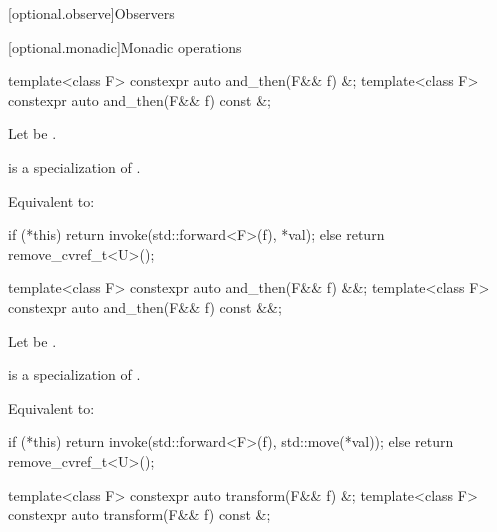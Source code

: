 [optional.observe]{Observers}

[optional.monadic]{Monadic operations}

\begin{itemdecl}
template<class F> constexpr auto and_then(F&& f) &;
template<class F> constexpr auto and_then(F&& f) const &;
\end{itemdecl}

\begin{itemdescr}
\pnum
Let  be .

\pnum
\mandates
{} is a specialization of .

\pnum
\effects
Equivalent to:
\begin{codeblock}
if (*this) {
  return invoke(std::forward<F>(f), *val);
} else {
  return remove_cvref_t<U>();
}
\end{codeblock}
\end{itemdescr}

\begin{itemdecl}
template<class F> constexpr auto and_then(F&& f) &&;
template<class F> constexpr auto and_then(F&& f) const &&;
\end{itemdecl}

\begin{itemdescr}
\pnum
Let  be .

\pnum
\mandates
{} is a specialization of .

\pnum
\effects
Equivalent to:
\begin{codeblock}
if (*this) {
  return invoke(std::forward<F>(f), std::move(*val));
} else {
  return remove_cvref_t<U>();
}
\end{codeblock}
\end{itemdescr}

\begin{itemdecl}
template<class F> constexpr auto transform(F&& f) &;
template<class F> constexpr auto transform(F&& f) const &;
\end{itemdecl}

